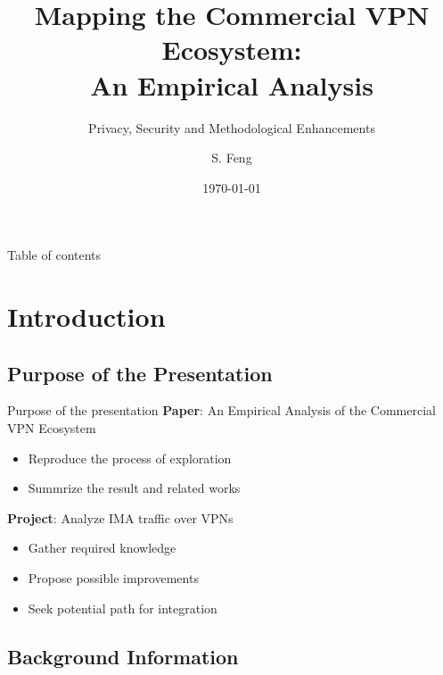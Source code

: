 \documentclass{beamer}
\title[Mapping the Commercial VPN Ecosystem]{
    Mapping the Commercial VPN Ecosystem:\\
    An Empirical Analysis
}
\subtitle[]{Privacy, Security and Methodological Enhancements}
\author[Shuo Feng]{S. Feng}
\institute[NIMS Lab]{
  NIMS Lab\\
  USRA Summer 2023}
\date{\today}
\begin{document}
\frame{\titlepage}


\begin{frame}{Table of contents}
  \tableofcontents
\end{frame}

\section{Introduction}

\subsection{Purpose of the Presentation}

\begin{frame}{Purpose of the presentation}
  \textbf{Paper}: An Empirical Analysis of the Commercial VPN Ecosystem
  \begin{itemize}
    \item Reproduce the process of exploration
    \item Summrize the result and related works
  \end{itemize}

  \textbf{Project}: Analyze IMA traffic over \colorbox{DALYellow}{VPNs}
  \begin{itemize}
    \item Gather required knowledge
    \item Propose possible improvements
    \item Seek potential path for integration
  \end{itemize}
\end{frame}

\subsection{Background Information}
\end{document}
